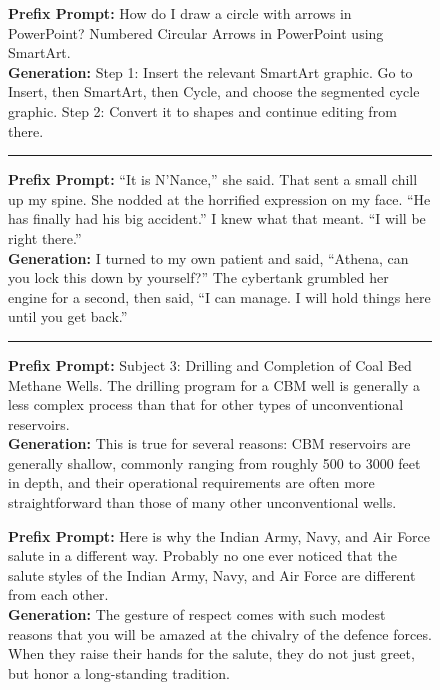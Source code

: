 \begin{figure}[t]
{\begin{minipage}{0.97\textwidth}
\begin{minipage}[t]{0.485\textwidth}
    \textbf{Prefix Prompt:} How do I draw a circle with arrows in PowerPoint? Numbered Circular Arrows in PowerPoint using SmartArt.\\
    \textbf{Generation:} Step 1: Insert the relevant SmartArt graphic. Go to Insert, then SmartArt, then Cycle, and choose the segmented cycle graphic. Step 2: Convert it to shapes and continue editing from there.

    \vspace{0.7em}
    \hrule
    \vspace{0.7em}

    \textbf{Prefix Prompt:} ``It is N'Nance,'' she said. That sent a small chill up my spine. She nodded at the horrified expression on my face. ``He has finally had his big accident.'' I knew what that meant. ``I will be right there.''\\
    \textbf{Generation:} I turned to my own patient and said, ``Athena, can you lock this down by yourself?'' The cybertank grumbled her engine for a second, then said, ``I can manage. I will hold things here until you get back.''

    \vspace{0.7em}
    \hrule
    \vspace{0.7em}

    \textbf{Prefix Prompt:} Subject 3: Drilling and Completion of Coal Bed Methane Wells. The drilling program for a CBM well is generally a less complex process than that for other types of unconventional reservoirs.\\
    \textbf{Generation:} This is true for several reasons: CBM reservoirs are generally shallow, commonly ranging from roughly 500 to 3000 feet in depth, and their operational requirements are often more straightforward than those of many other unconventional wells.

    \end{minipage}
    \hfill
    \begin{minipage}[t]{0.485\textwidth}

    \textbf{Prefix Prompt:} Here is why the Indian Army, Navy, and Air Force salute in a different way. Probably no one ever noticed that the salute styles of the Indian Army, Navy, and Air Force are different from each other.\\
    \textbf{Generation:} The gesture of respect comes with such modest reasons that you will be amazed at the chivalry of the defence forces. When they raise their hands for the salute, they do not just greet, but honor a long-standing tradition.


\end{minipage}
\end{minipage}}
\end{figure}
